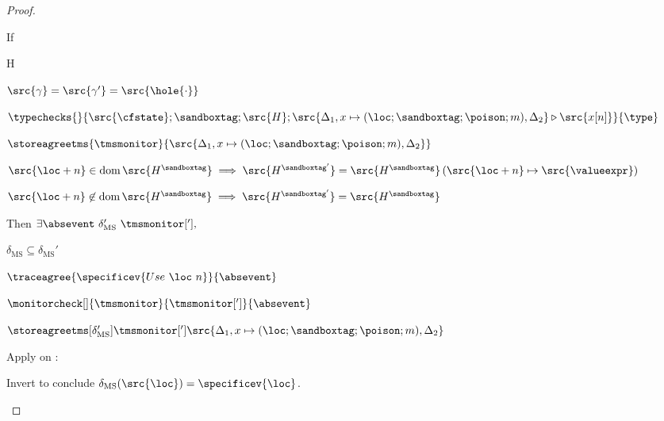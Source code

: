 \documentclass[a4paper,names,dvipsnames]{article}
\begin{document}
\begin{proof}
\begin{description}
      If
      \begin{passumptions}{H}
        \item $\src{\gamma}=\src{\gamma'}=\src{\hole{\cdot}}$
        \item $\typechecks{}{\src{\cfstate};\sandboxtag;\src{H};\src{\Delta_1,x\mapsto(\loc;\sandboxtag;\poison;m),\Delta_2}\triangleright\src{x[n]}}{\type}$
        \item $\storeagreetms{\tmsmonitor}{\src{\Delta_1,x\mapsto(\loc;\sandboxtag;\poison;m),\Delta_2}}$
        \item $\src{\loc+n}\in\operatorname{dom}\src{H^{\sandboxtag}}\implies \src{H^{\sandboxtag'}}=\src{H^{\sandboxtag}}\left(\src{\loc+n}\mapsto\src{\valueexpr}\right)$
        \item $\src{\loc+n}\not\in\operatorname{dom}\src{H^{\sandboxtag}}\implies \src{H^{\sandboxtag'}}=\src{H^{\sandboxtag}}$
      \end{passumptions}
      Then $\exists \absevent\ \delta_{\text{MS}}'\ \tmsmonitor['],$
      \begin{goals}
        \item $\delta_{\text{MS}}\subseteq\delta_{\text{MS}}'$
        \item $\traceagree{\specificev{Use\ \loc\ n}}{\absevent}$
        \item $\monitorcheck[]{\tmsmonitor}{\tmsmonitor[']}{\absevent}$
        \item $\storeagreetms[\delta_{\text{MS}}']{\tmsmonitor[']}{\src{\Delta_1,x\mapsto(\loc;\sandboxtag;\poison;m),\Delta_2}}$
      \end{goals}
      Apply  on :
      Invert  to conclude $\delta_{\text{MS}}(\src{\loc})=\specificev{\loc}$.

\end{description}
\end{proof}
\end{document}
